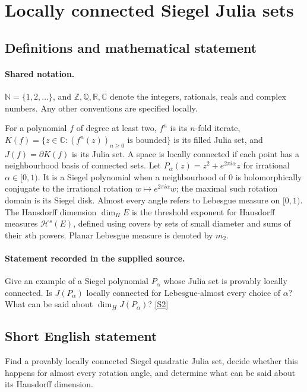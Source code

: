 \documentclass[11pt]{article}
\newcommand{\sref}[2]{\hyperlink{source:#1:#2}{[S#2]}}
\begin{document}
\section{Locally connected Siegel Julia sets}\label{statement}

\subsection{Definitions and mathematical statement}

\paragraph{Shared notation.}$\mathbb N=\{1,2,\ldots\}$, and $\mathbb Z,\mathbb Q,\mathbb R,\mathbb C$ denote the integers, rationals, reals and complex numbers. Any other conventions are specified locally.


For a polynomial $f$ of degree at least two, $f^n$ is its $n$-fold iterate, $K(f)=\{z\in\mathbb C:(f^n(z))_{n\geq0}\text{ is bounded}\}$ is its filled Julia set, and $J(f)=\partial K(f)$ is its Julia set. A space is locally connected if each point has a neighbourhood basis of connected sets. Let $P_\alpha(z)=z^2+e^{2\pi i\alpha}z$ for irrational $\alpha\in[0,1)$. It is a Siegel polynomial when a neighbourhood of $0$ is holomorphically conjugate to the irrational rotation $w\mapsto e^{2\pi i\alpha}w$; the maximal such rotation domain is its Siegel disk. Almost every angle refers to Lebesgue measure on $[0,1)$. The Hausdorff dimension $\dim_H E$ is the threshold exponent for Hausdorff measures $\mathcal H^s(E)$, defined using covers by sets of small diameter and sums of their $s$th powers. Planar Lebesgue measure is denoted by $m_2$.
\paragraph{Statement recorded in the supplied source.}
Give an example of a Siegel polynomial $P_\alpha$ whose Julia set is provably locally connected. Is $J(P_\alpha)$ locally connected for Lebesgue-almost every choice of $\alpha$? What can be said about $\dim_HJ(P_\alpha)$? \sref{statement}{2}
\subsection{Short English statement}
Find a provably locally connected Siegel quadratic Julia set, decide whether this happens for almost every rotation angle, and determine what can be said about its Hausdorff dimension.
\end{document}
